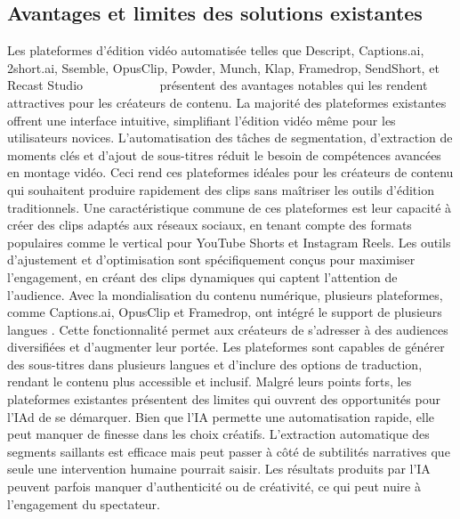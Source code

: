 \documentclass[livre]{udes-genie-these}
\begin{document}
\subsection{Avantages et limites des solutions existantes}
Les plateformes d'édition vidéo automatisée telles que Descript, Captions.ai, 2short.ai, Ssemble, OpusClip, Powder, Munch, Klap, Framedrop, SendShort, et Recast Studio \newline ~\cite{descript2024}~\cite{captions2024}~\cite{short2024}~\cite{ssemble2024}~\cite{opusclip2024}~\cite{powder2024}~\cite{munch2024}~\cite{klap2024}~\cite{framedrop2024}~\cite{sendshort2024}~\cite{recast2024} présentent des avantages notables qui les rendent attractives pour les créateurs de contenu.
La majorité des plateformes existantes offrent une interface intuitive, simplifiant l'édition vidéo même pour les utilisateurs novices. L'automatisation des tâches de segmentation, d'extraction de moments clés et d'ajout de sous-titres réduit le besoin de compétences avancées en montage vidéo. Ceci rend ces plateformes idéales pour les créateurs de contenu qui souhaitent produire rapidement des clips sans maîtriser les outils d'édition traditionnels.
Une caractéristique commune de ces plateformes est leur capacité à créer des clips adaptés aux réseaux sociaux, en tenant compte des formats populaires comme le vertical pour YouTube Shorts et Instagram Reels. Les outils d'ajustement et d'optimisation sont spécifiquement conçus pour maximiser l'engagement, en créant des clips dynamiques qui captent l'attention de l'audience.
Avec la mondialisation du contenu numérique, plusieurs plateformes, comme Captions.ai, OpusClip et Framedrop, ont intégré le support de plusieurs langues \cite{captions2024}\cite{opusclip2024}\cite{framedrop2024}. Cette fonctionnalité permet aux créateurs de s'adresser à des audiences diversifiées et d'augmenter leur portée. Les plateformes sont capables de générer des sous-titres dans plusieurs langues et d'inclure des options de traduction, rendant le contenu plus accessible et inclusif.
Malgré leurs points forts, les plateformes existantes présentent des limites qui ouvrent des opportunités pour l'IAd de se démarquer.
Bien que l'IA permette une automatisation rapide, elle peut manquer de finesse dans les choix créatifs. L'extraction automatique des segments saillants est efficace mais peut passer à côté de subtilités narratives que seule une intervention humaine pourrait saisir. Les résultats produits par l'IA peuvent parfois manquer d'authenticité ou de créativité, ce qui peut nuire à l'engagement du spectateur.
\end{document}
